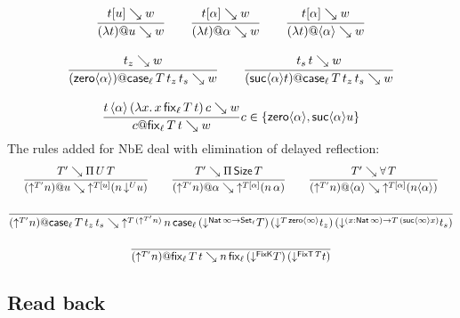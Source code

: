 \documentclass[acmlarge,review,anonymous]{acmart}\settopmatter{printfolios=true}
\begin{document}
\begin{gather*}
  \ru{t[u] \evalsto w
    }{(\lambda t) @ u \evalsto w}
\qquad
  \ru{t[\alpha] \evalsto w
    }{(\lambda t) @ \alpha \evalsto w}
\qquad
  \ru{t[\alpha] \evalsto w
    }{(\lambda t) @ \ann \alpha \evalsto w}
\\[2ex]
  \ru{t_z \evalsto w
    }{(\zero \alpha) @ \casett \evalsto w}
\qquad
  \ru{t_s\, t \evalsto w
    }{(\suc \alpha t) @ \casett \evalsto w}
\\[2ex]
  \ru{t\,\ann \alpha\,(\lambda x.\, x\, \fixtt)\,c \evalsto w
     }{c @ \fixtt \evalsto w
     }{c\in \{ \zero \alpha, \suc \alpha u \}}
\end{gather*}
The rules added for NbE deal with elimination of delayed reflection:
\begin{gather*}
  \ru{T' \evalsto \piT U T
    }{(\up {T'} n) @ u \evalsto \up{T[u]} (n \, \down U u) }
\qquad
  \ru{T' \evalsto \piT \Size T
    }{(\up {T'} n) @ \alpha \evalsto \up{T[\alpha]} (n \, \alpha)}
\qquad
  \ru{T' \evalsto \forallT T
    }{(\up {T'} n) @ \ann \alpha \evalsto \up{T[\alpha]} (n \ann \alpha)}
\\[2ex]
  \ru{%
    }{(\up {T'} n) @ \case[\ell] T {t_z} {t_s} \evalsto
      \up{T\,(\up{T'} n)}\,
         n\,\case[\ell]
             {(\down {\Nat \infty \to \Set[\ell]} T)}
             {(\down {T\,{\zero\infty}} t_z)}
             {(\down {\funS x {\Nat \infty} T\,(\suc \infty x)} t_s)}
    }
\\[2ex]
  \ru{%
    }{(\up {T'} n) @ \fix[\ell] T t \evalsto
      n\,\fix[\ell] {(\down {\FixK} T)} {(\down {\FixT\, T} t)}
    }
\end{gather*}

\subsection{Read back}
\label{sec:read}
\end{document}
